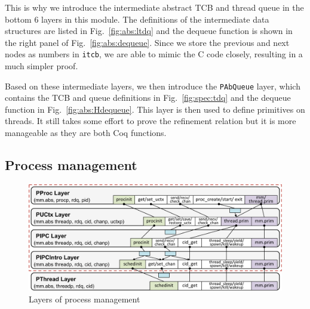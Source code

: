 This is why we introduce the intermediate abstract TCB and thread
queue in the bottom 6 layers in this module.  The definitions of the
intermediate data structures are listed in Fig.\ \ref{fig:abs:ltdq} and
the dequeue function is shown in the right panel of
Fig.\ \ref{fig:abs:dequeue}.  Since we store the previous and next
nodes as numbers in \verb"itcb", we are able to mimic the C code
closely, resulting in a much simpler proof.

Based on these intermediate layers, we then introduce the
\verb"PAbQueue" layer, which contains the TCB and queue definitions in
Fig.\ \ref{fig:spec:tdq} and the dequeue function in
Fig.\ \ref{fig:abs:Hdequeue}. This layer is then used to define
primitives on threads.  It still takes some effort to prove the
refinement relation but it is more manageable as they are both Coq
functions. 

\subsection{Process management}
\label{sec:base:pm} 


{
\setlength{\belowcaptionskip}{-10pt}
\begin{figure}
\begin{center}
\includegraphics[scale=0.31]{figs/pm_layer}	
\caption{Layers of process management}
\label{fig:base:pm:layers}
\end{center}
\vspace*{-14pt}
\end{figure}
}
 
